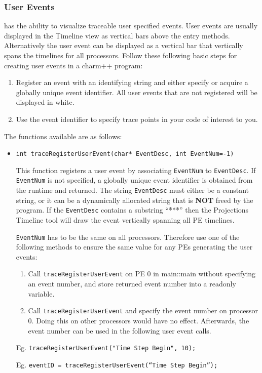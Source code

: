 \documentclass[10pt]{article}
\begin{document}
\subsubsection{User Events}
\label{sec::user events}

\projections{} has the ability to visualize traceable user
specified events. User events are usually displayed in the Timeline view as vertical bars above the entry methods. Alternatively the user event can be displayed as a vertical bar that vertically spans the timelines for all processors. Follow these following basic steps for creating user events in a charm++ program:

\begin{enumerate}
\item
Register an event with an identifying string and either specify or acquire
a globally unique event identifier. All user events that are not registered will be displayed in white.

\item
Use the event identifier to specify trace points in your code of interest to you.
\end{enumerate}

The functions available are as follows:

\begin{itemize}
\item
{\tt int traceRegisterUserEvent(char* EventDesc, int EventNum=-1) }

This function registers a user event by associating {\tt EventNum} to
{\tt EventDesc}. If {\tt EventNum} is not specified, a globally unique
event identifier is obtained from the runtime and returned. The string {\tt EventDesc} must either be a constant string, or it can be a dynamically allocated string that is {\bf NOT} freed by the program. If the {\tt EventDesc} contains a substring ``***'' then the Projections Timeline tool will draw the event vertically spanning all PE timelines.

{\tt EventNum} has to be the same on all processors. Therefore use one of the following methods to ensure the same value for any PEs generating the user events:

\begin{enumerate}
\item
Call {\tt traceRegisterUserEvent} on PE 0 in main::main without specifying
an event number, and store returned event number into a readonly variable.
\item
Call {\tt traceRegisterUserEvent} and specify the event number on
processor 0. Doing this on other processors would have no
effect. Afterwards, the event number can be used in the following user
event calls.
\end{enumerate}

Eg. {\tt traceRegisterUserEvent("Time Step Begin", 10);}

Eg. {\tt eventID = traceRegisterUserEvent(``Time Step Begin'');}

\end{itemize}
\end{document}

